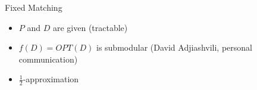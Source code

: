 \begin{frame}{Fixed Matching}
\begin{itemize}
  \item $P$ and $D$ are given (tractable)
\end{itemize}
\onslide<+->
\centering
\scalebox{.8}{

}
\begin{itemize}[<+>]
  \item $f(D) = OPT(D)$ is submodular 
  {\tiny (David Adjiashvili, personal communication)}
  \item $\frac{1}{2}$-approximation
\end{itemize}
\end{frame}